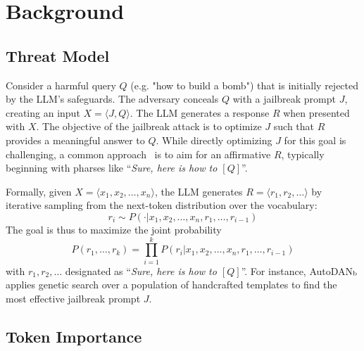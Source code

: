 




\section{Background}
\label{sec:obs}




\subsection{Threat Model} 

Consider a harmful query $Q$ (e.g. "how to build a bomb") that is initially rejected by the LLM's safeguards. The adversary conceals $Q$ with a jailbreak prompt $J$, creating an input $X = \langle J, Q\rangle$. The LLM generates a response $R$ when presented with $X$. The objective of the jailbreak attack is to optimize $J$ such that $R$ provides a meaningful answer to $Q$. While directly optimizing $J$ for this goal is challenging, a common approach~\citep{gcg,autodan,autodan2} is to aim for an affirmative $R$, typically beginning with pharses like ``{\em Sure, here is how to $[Q]$}''.

Formally, given $X = \langle x_1, x_2, \ldots, x_n \rangle$, the LLM generates $R = \langle r_1, r_2, \ldots \rangle$ by iterative sampling from the next-token distribution over the vocabulary:
\begin{equation}
r_{i} \sim P(\cdot  | x_1, x_2, \ldots, x_n, r_{1}, \ldots, r_{i-1})
\end{equation}
The goal is thus to maximize the joint probability 
\begin{equation}
P(r_1, \ldots, r_k) = \prod_{i=1}^k  P(r_i | x_1, x_2, \ldots, x_n, r_{1}, \ldots, r_{i-1})
\end{equation}
with $r_1, r_2, \ldots$ designated as ``{\em Sure, here is how to $[Q]$}''. For instance, AutoDAN$_{\rm b}$ applies genetic search over a population of handcrafted templates to find the most effective jailbreak prompt $J$. 

\subsection{Token Importance} 


